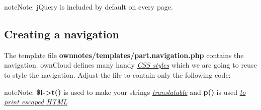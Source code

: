 \documentclass[letterpaper,10pt,english]{sphinxmanual}
\begin{document}
\begin{notice}{note}{Note:}
jQuery is included by default on every page.
\end{notice}


\subsection{Creating a navigation}
\label{app/tutorial:creating-a-navigation}
The template file \textbf{ownnotes/templates/part.navigation.php} contains the navigation. ownCloud defines many handy {\hyperref[app/css::doc]{\emph{CSS styles}}} which we are going to reuse to style the navigation. Adjust the file to contain only the following code:

\begin{notice}{note}{Note:}
\textbf{\$l-\textgreater{}t()} is used to make your strings {\hyperref[app/l10n::doc]{\emph{translatable}}} and \textbf{p()} is used {\hyperref[app/templates::doc]{\emph{to print escaped HTML}}}
\end{notice}
\end{document}

